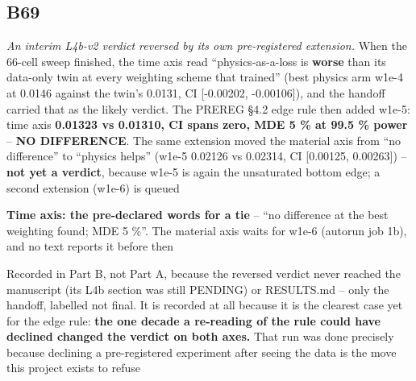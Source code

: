 \documentclass[10pt]{article}
\begin{document}
\subsection*{B69}\label{led:B69}
\begin{description}[leftmargin=0pt,itemsep=1pt]
\item[Defect.] \emph{An interim L4b-v2 verdict reversed by its own pre-registered extension.} When the 66-cell sweep finished, the time axis read ``physics-as-a-loss is \textbf{worse} than its data-only twin at every weighting scheme that trained'' (best physics arm w1e-4 at 0.0146 against the twin's 0.0131, CI [-0.00202, -0.00106]), and the handoff carried that as the likely verdict. The PREREG §4.2 edge rule then added w1e-5: time axis \textbf{0.01323 vs 0.01310, CI spans zero, MDE 5 \% at 99.5 \% power} -- \textbf{NO DIFFERENCE}. The same extension moved the material axis from ``no difference'' to ``physics helps'' (w1e-5 0.02126 vs 0.02314, CI [0.00125, 0.00263]) -- \textbf{not yet a verdict}, because w1e-5 is again the unsaturated bottom edge; a second extension (w1e-6) is queued
\item[Resolution.] \textbf{Time axis: the pre-declared words for a tie} -- ``no difference at the best weighting found; MDE 5 \%''. The material axis waits for w1e-6 (autorun job 1b), and no text reports it before then
\item[Note.] Recorded in Part B, not Part A, because the reversed verdict never reached the manuscript (its L4b section was still PENDING) or RESULTS.md -- only the handoff, labelled not final. It is recorded at all because it is the clearest case yet for the edge rule: \textbf{the one decade a re-reading of the rule could have declined changed the verdict on both axes.} That run was done precisely because declining a pre-registered experiment after seeing the data is the move this project exists to refuse
\end{description}
\end{document}
